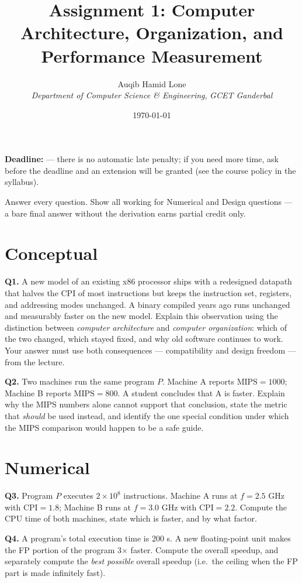 \documentclass[11pt]{article}
\title{Assignment 1: Computer Architecture, Organization, and Performance Measurement}
\author{Auqib Hamid Lone\\[0.3em]
  \emph{Department of Computer Science \& Engineering}, \emph{GCET Ganderbal}}
\date{\today}
\begin{document}
\maketitle

\noindent\textbf{Deadline:}  --- there is no automatic late penalty; if you need more time, ask before the deadline and an extension will be granted (see the course policy in the syllabus).

\noindent Answer every question. Show all working for Numerical and Design questions --- a bare final answer without the derivation earns partial credit only.

\section{Conceptual}

\textbf{Q1.} A new model of an existing x86 processor ships with a redesigned datapath that halves the CPI of most instructions but keeps the instruction set, registers, and addressing modes unchanged. A binary compiled years ago runs unchanged and measurably faster on the new model. Explain this observation using the distinction between \emph{computer architecture} and \emph{computer organization}: which of the two changed, which stayed fixed, and why old software continues to work. Your answer must use both consequences --- compatibility and design freedom --- from the lecture.

\textbf{Q2.} Two machines run the same program $P$. Machine A reports $\text{MIPS} = 1000$; Machine B reports $\text{MIPS} = 800$. A student concludes that A is faster. Explain why the MIPS numbers alone cannot support that conclusion, state the metric that \emph{should} be used instead, and identify the one special condition under which the MIPS comparison would happen to be a safe guide.

\section{Numerical}

\textbf{Q3.} Program $P$ executes $2 \times 10^8$ instructions. Machine A runs at $f = 2.5$ GHz with $\text{CPI} = 1.8$; Machine B runs at $f = 3.0$ GHz with $\text{CPI} = 2.2$. Compute the CPU time of both machines, state which is faster, and by what factor.

\textbf{Q4.} A program's total execution time is 200 s. A new floating-point unit makes the FP portion of the program 3$\times$ faster. Compute the overall speedup, and separately compute the \emph{best possible} overall speedup (i.e.\ the ceiling when the FP part is made infinitely fast).
\end{document}
